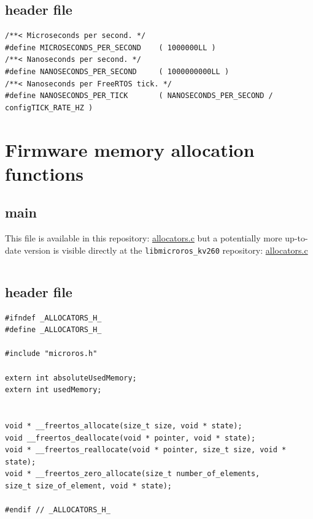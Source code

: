 \documentclass[10pt]{article}
\begin{document}
\subsection{header file}
\label{sec:org72acd24}
\begin{verbatim}
/**< Microseconds per second. */
#define MICROSECONDS_PER_SECOND    ( 1000000LL )  
/**< Nanoseconds per second. */
#define NANOSECONDS_PER_SECOND     ( 1000000000LL ) 
/**< Nanoseconds per FreeRTOS tick. */  
#define NANOSECONDS_PER_TICK       ( NANOSECONDS_PER_SECOND / configTICK_RATE_HZ ) 
\end{verbatim}


\pagebreak
\section{Firmware memory allocation functions}
\label{sec:org42ad8bc}

\subsection{main}
\label{sec:org7c9bddc}
This file is available in this repository: \href{https://gitlab.com/sunoc/xilinx-kria-kv260-documentation/-/blob/b7300116e153f4b5a1542f8804e4646db8030033/src/allocators.c}{allocators.c}
but a potentially more up-to-date version is visible
directly at the \texttt{libmicroros\_kv260} repository: \href{https://gitlab.com/sunoc/libmicroros\_kv260/-/blob/4867e762f66af7b4647232eb4c0a31106db66e13/src/allocators.c}{allocators.c}

\inputminted[linenos, frame=single]{c}{./src/allocators.c}

\subsection{header file}
\label{sec:org6df077c}
\begin{verbatim}
#ifndef _ALLOCATORS_H_
#define _ALLOCATORS_H_

#include "microros.h"

extern int absoluteUsedMemory;
extern int usedMemory;


void * __freertos_allocate(size_t size, void * state);
void __freertos_deallocate(void * pointer, void * state);
void * __freertos_reallocate(void * pointer, size_t size, void * state);
void * __freertos_zero_allocate(size_t number_of_elements,
size_t size_of_element, void * state);

#endif // _ALLOCATORS_H_
\end{verbatim}
\end{document}
